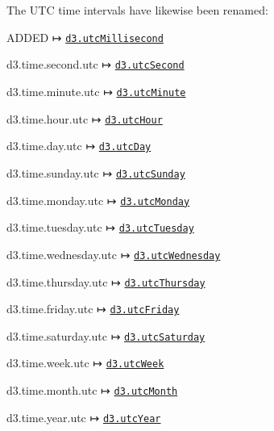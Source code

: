 The U\+TC time intervals have likewise been renamed\+:


\begin{DoxyItemize}
\item A\+D\+D\+ED ↦ \href{https://github.com/d3/d3-time/blob/master/README.md#utcMillisecond}{\tt d3.\+utc\+Millisecond}
\item d3.\+time.\+second.\+utc ↦ \href{https://github.com/d3/d3-time/blob/master/README.md#utcSecond}{\tt d3.\+utc\+Second}
\item d3.\+time.\+minute.\+utc ↦ \href{https://github.com/d3/d3-time/blob/master/README.md#utcMinute}{\tt d3.\+utc\+Minute}
\item d3.\+time.\+hour.\+utc ↦ \href{https://github.com/d3/d3-time/blob/master/README.md#utcHour}{\tt d3.\+utc\+Hour}
\item d3.\+time.\+day.\+utc ↦ \href{https://github.com/d3/d3-time/blob/master/README.md#utcDay}{\tt d3.\+utc\+Day}
\item d3.\+time.\+sunday.\+utc ↦ \href{https://github.com/d3/d3-time/blob/master/README.md#utcSunday}{\tt d3.\+utc\+Sunday}
\item d3.\+time.\+monday.\+utc ↦ \href{https://github.com/d3/d3-time/blob/master/README.md#utcMonday}{\tt d3.\+utc\+Monday}
\item d3.\+time.\+tuesday.\+utc ↦ \href{https://github.com/d3/d3-time/blob/master/README.md#utcTuesday}{\tt d3.\+utc\+Tuesday}
\item d3.\+time.\+wednesday.\+utc ↦ \href{https://github.com/d3/d3-time/blob/master/README.md#utcWednesday}{\tt d3.\+utc\+Wednesday}
\item d3.\+time.\+thursday.\+utc ↦ \href{https://github.com/d3/d3-time/blob/master/README.md#utcThursday}{\tt d3.\+utc\+Thursday}
\item d3.\+time.\+friday.\+utc ↦ \href{https://github.com/d3/d3-time/blob/master/README.md#utcFriday}{\tt d3.\+utc\+Friday}
\item d3.\+time.\+saturday.\+utc ↦ \href{https://github.com/d3/d3-time/blob/master/README.md#utcSaturday}{\tt d3.\+utc\+Saturday}
\item d3.\+time.\+week.\+utc ↦ \href{https://github.com/d3/d3-time/blob/master/README.md#utcWeek}{\tt d3.\+utc\+Week}
\item d3.\+time.\+month.\+utc ↦ \href{https://github.com/d3/d3-time/blob/master/README.md#utcMonth}{\tt d3.\+utc\+Month}
\item d3.\+time.\+year.\+utc ↦ \href{https://github.com/d3/d3-time/blob/master/README.md#utcYear}{\tt d3.\+utc\+Year}
\end{DoxyItemize}

